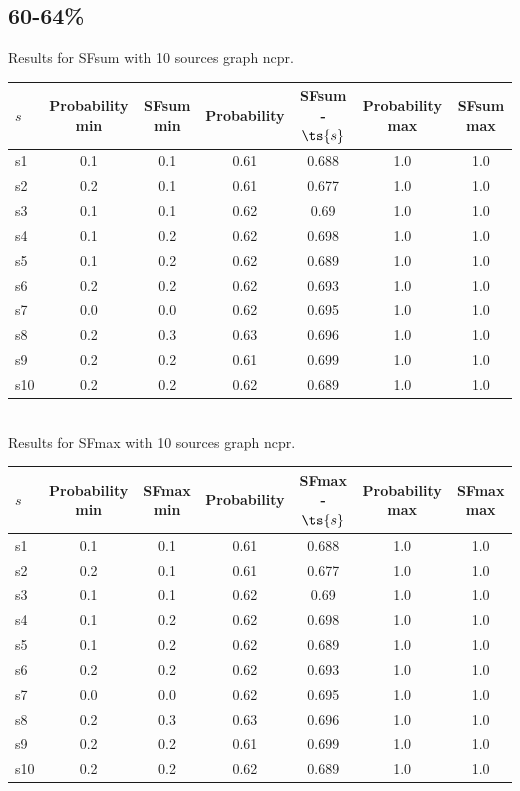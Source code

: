 \documentclass{article}
\begin{document}
\newpage

\subsection{60-64\%}

\noindent Results for SFsum with 10 sources graph ncpr.

\noindent\begin{tabular}{|l|c|c|c|c|c|c|}
\hline
$s$& Probability min & SFsum min & Probability & SFsum - $\ts{s}$ & Probability max & SFsum max\\
\hline
s1 &0.1 & 0.1 & 0.61 & 0.688 & 1.0 & 1.0\\
\hline
s2 &0.2 & 0.1 & 0.61 & 0.677 & 1.0 & 1.0\\
\hline
s3 &0.1 & 0.1 & 0.62 & 0.69 & 1.0 & 1.0\\
\hline
s4 &0.1 & 0.2 & 0.62 & 0.698 & 1.0 & 1.0\\
\hline
s5 &0.1 & 0.2 & 0.62 & 0.689 & 1.0 & 1.0\\
\hline
s6 &0.2 & 0.2 & 0.62 & 0.693 & 1.0 & 1.0\\
\hline
s7 &0.0 & 0.0 & 0.62 & 0.695 & 1.0 & 1.0\\
\hline
s8 &0.2 & 0.3 & 0.63 & 0.696 & 1.0 & 1.0\\
\hline
s9 &0.2 & 0.2 & 0.61 & 0.699 & 1.0 & 1.0\\
\hline
s10 &0.2 & 0.2 & 0.62 & 0.689 & 1.0 & 1.0\\
\hline
\end{tabular}\\

\noindent Results for SFmax with 10 sources graph ncpr.

\noindent\begin{tabular}{|l|c|c|c|c|c|c|}
\hline
$s$& Probability min & SFmax min & Probability & SFmax - $\ts{s}$ & Probability max & SFmax max\\
\hline
s1 &0.1 & 0.1 & 0.61 & 0.688 & 1.0 & 1.0\\
\hline
s2 &0.2 & 0.1 & 0.61 & 0.677 & 1.0 & 1.0\\
\hline
s3 &0.1 & 0.1 & 0.62 & 0.69 & 1.0 & 1.0\\
\hline
s4 &0.1 & 0.2 & 0.62 & 0.698 & 1.0 & 1.0\\
\hline
s5 &0.1 & 0.2 & 0.62 & 0.689 & 1.0 & 1.0\\
\hline
s6 &0.2 & 0.2 & 0.62 & 0.693 & 1.0 & 1.0\\
\hline
s7 &0.0 & 0.0 & 0.62 & 0.695 & 1.0 & 1.0\\
\hline
s8 &0.2 & 0.3 & 0.63 & 0.696 & 1.0 & 1.0\\
\hline
s9 &0.2 & 0.2 & 0.61 & 0.699 & 1.0 & 1.0\\
\hline
s10 &0.2 & 0.2 & 0.62 & 0.689 & 1.0 & 1.0\\
\hline
\end{tabular}\\
\end{document}
